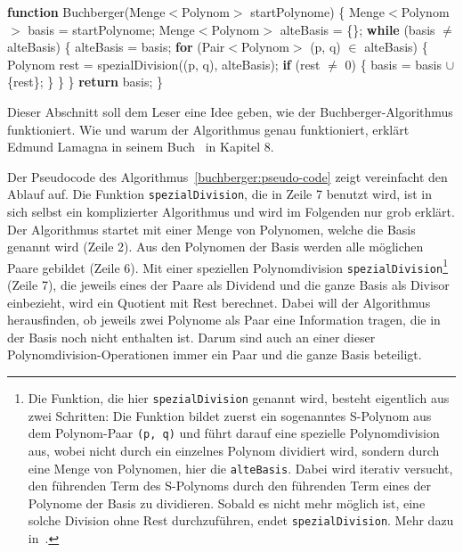 \begin{algorithm}[t]
\caption{Pseudocode des Buchberger-Algorithmus in C++/Java ähnlichem Stil\raisebox{1pt}{\strut}%
\label{buchberger:pseudo-code}}
\begin{algorithmic}[1]
  \State \textbf{function} Buchberger(Menge$<$Polynom$>$ startPolynome) \{
    \State \quad Menge$<$Polynom$>$ basis = startPolynome;
    \State \quad Menge$<$Polynom$>$ alteBasis = \{\};
    \State \quad \textbf{while} (basis $\neq$ alteBasis) \{
      \State \quad \quad alteBasis = basis;
      \State \quad \quad \textbf{for} (Pair$<$Polynom$>$ (p, q) $\in$ alteBasis) \{
        \State \quad \quad \quad Polynom rest = spezialDivision((p, q), alteBasis);
        \State \quad \quad \quad \textbf{if} (rest $\neq$ 0) \{
          \State \quad \quad \quad \quad basis = basis $\cup$ \{rest\}; 
        \State \quad \quad \quad \} %
      \State \quad \quad \} %
    \State \quad \} %
    \State \quad \textbf{return} basis;
  \State \} %
\end{algorithmic}
\end{algorithm}

Dieser Abschnitt soll dem Leser eine Idee geben, wie der Buchberger-Algorithmus funktioniert.
Wie und warum der Algorithmus genau funktioniert, erklärt Edmund Lamagna in seinem Buch~\cite{buchberger:computer-algebra} in Kapitel 8.

Der Pseudocode des Algorithmus~\ref{buchberger:pseudo-code} zeigt vereinfacht den Ablauf auf.
Die Funktion \texttt{spezialDivision}, die in Zeile 7 benutzt wird, ist in sich selbst ein komplizierter Algorithmus und wird im Folgenden nur grob erklärt.
Der Algorithmus startet mit einer Menge von Polynomen, welche die Basis genannt wird (Zeile 2).
Aus den Polynomen der Basis werden alle möglichen Paare gebildet (Zeile 6).
Mit einer speziellen Polynomdivision \texttt{spezialDivision}\footnote{Die Funktion, die hier \texttt{spezialDivision} genannt wird, besteht eigentlich aus zwei Schritten:
  Die Funktion bildet zuerst ein sogenanntes S-Polynom aus dem Polynom-Paar \texttt{(p, q)} und führt darauf eine spezielle Polynomdivision aus,
  wobei nicht durch ein einzelnes Polynom dividiert wird, sondern durch eine Menge von Polynomen, hier die \texttt{alteBasis}.
  Dabei wird iterativ versucht, den führenden Term des S-Polynoms durch den führenden Term eines der Polynome der Basis zu dividieren.
  Sobald es nicht mehr möglich ist, eine solche Division ohne Rest durchzuführen, endet \texttt{spezialDivision}.
  Mehr dazu in~\cite{buchberger:computer-algebra}.
} (Zeile 7), die jeweils eines der Paare als Dividend und die ganze Basis als Divisor einbezieht, wird ein Quotient mit Rest berechnet.
Dabei will der Algorithmus herausfinden, ob jeweils zwei Polynome als Paar eine Information tragen, die in der Basis noch nicht enthalten ist.
Darum sind auch an einer dieser Polynomdivision-Operationen immer ein Paar und die ganze Basis beteiligt.

